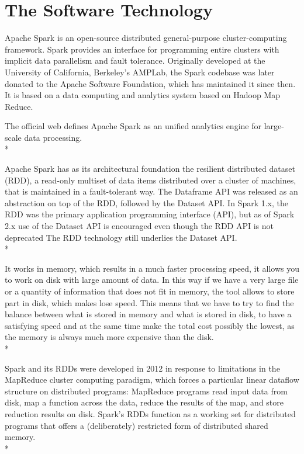 \section{The Software Technology}
\label{sec:background}


Apache Spark is an open-source distributed general-purpose cluster-computing framework. Spark provides an interface for programming entire clusters with implicit data parallelism and fault tolerance. Originally developed at the University of California, Berkeley's AMPLab, the Spark codebase was later donated to the Apache Software Foundation, which has maintained it since then. It is based on a data computing and analytics system based on Hadoop Map Reduce.

The official web defines Apache Spark as an unified analytics engine for large-scale data processing.\cite{sparkWebsite} \\*

Apache Spark has as its architectural foundation the resilient distributed dataset (RDD), a read-only multiset of data items distributed over a cluster of machines, that is maintained in a fault-tolerant way.\cite{brown:zaharia2010spark} The Dataframe API was released as an abstraction on top of the RDD, followed by the Dataset API. In Spark 1.x, the RDD was the primary application programming interface (API), but as of Spark 2.x use of the Dataset API is encouraged \cite{brown:eadline2015hadoop} even though the RDD API is not deprecated The RDD technology still underlies the Dataset API.\\*

It works in memory, which results in a much faster processing speed, it allows you to work on disk with large amount of data. In this way if we have a very large file or a quantity of information that does not fit in memory, the tool allows to store part in disk, which makes lose speed. This means that we have to try to find the balance between what is stored in memory and what is stored in disk, to have a satisfying speed and at the same time make  the total cost possibly the lowest, as the memory is always much more expensive than the disk.\\*

Spark and its RDDs were developed in 2012 in response to limitations in the MapReduce cluster computing paradigm, which forces a particular linear dataflow structure on distributed programs: MapReduce programs read input data from disk, map a function across the data, reduce the results of the map, and store reduction results on disk. Spark's RDDs function as a working set for distributed programs that offers a (deliberately) restricted form of distributed shared memory.\cite{zaharia2012resilient} \\*

